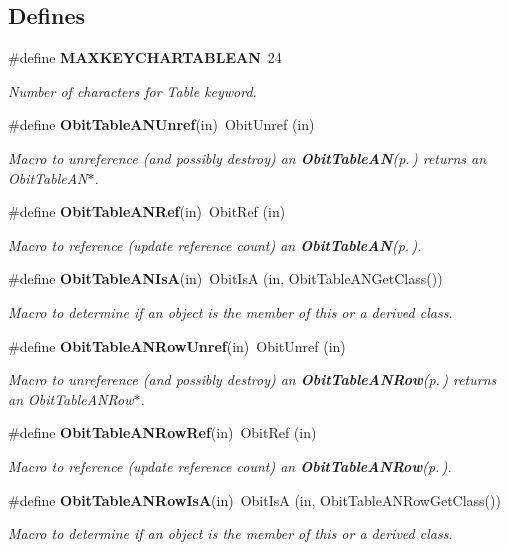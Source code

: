 \subsection*{Defines}
\begin{CompactItemize}
\item 
\#define {\bf MAXKEYCHARTABLEAN}\ 24
\begin{CompactList}\small\item\em Number of characters for Table keyword. \item\end{CompactList}\item 
\#define {\bf Obit\-Table\-ANUnref}(in)\ Obit\-Unref (in)
\begin{CompactList}\small\item\em Macro to unreference (and possibly destroy) an {\bf Obit\-Table\-AN}{\rm (p.\,\pageref{structObitTableAN})} returns an Obit\-Table\-AN$\ast$. \item\end{CompactList}\item 
\#define {\bf Obit\-Table\-ANRef}(in)\ Obit\-Ref (in)
\begin{CompactList}\small\item\em Macro to reference (update reference count) an {\bf Obit\-Table\-AN}{\rm (p.\,\pageref{structObitTableAN})}. \item\end{CompactList}\item 
\#define {\bf Obit\-Table\-ANIs\-A}(in)\ Obit\-Is\-A (in, Obit\-Table\-ANGet\-Class())
\begin{CompactList}\small\item\em Macro to determine if an object is the member of this or a derived class. \item\end{CompactList}\item 
\#define {\bf Obit\-Table\-ANRow\-Unref}(in)\ Obit\-Unref (in)
\begin{CompactList}\small\item\em Macro to unreference (and possibly destroy) an {\bf Obit\-Table\-ANRow}{\rm (p.\,\pageref{structObitTableANRow})} returns an Obit\-Table\-ANRow$\ast$. \item\end{CompactList}\item 
\#define {\bf Obit\-Table\-ANRow\-Ref}(in)\ Obit\-Ref (in)
\begin{CompactList}\small\item\em Macro to reference (update reference count) an {\bf Obit\-Table\-ANRow}{\rm (p.\,\pageref{structObitTableANRow})}. \item\end{CompactList}\item 
\#define {\bf Obit\-Table\-ANRow\-Is\-A}(in)\ Obit\-Is\-A (in, Obit\-Table\-ANRow\-Get\-Class())
\begin{CompactList}\small\item\em Macro to determine if an object is the member of this or a derived class. \item\end{CompactList}\end{CompactItemize}
